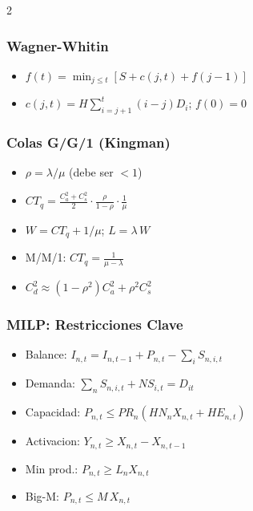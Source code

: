 \documentclass[11pt, a4paper]{article}
\begin{document}
\begin{multicols}{2}
\subsubsection*{Wagner-Whitin}
\begin{itemize}[leftmargin=1.2em, itemsep=1pt, label={$\bullet$}]
  \item $f(t) = \min_{j \le t}[S + c(j,t) + f(j-1)]$
  \item $c(j,t) = H\sum_{i=j+1}^{t}(i-j)D_i$; $f(0)=0$
\end{itemize}

\subsubsection*{Colas G/G/1 (Kingman)}
\begin{itemize}[leftmargin=1.2em, itemsep=1pt, label={$\bullet$}]
  \item $\rho = \lambda/\mu$ (debe ser $<1$)
  \item $CT_q = \frac{C_a^2+C_s^2}{2}\cdot\frac{\rho}{1-\rho}\cdot\frac{1}{\mu}$
  \item $W = CT_q + 1/\mu$; $L = \lambda\,W$
  \item M/M/1: $CT_q = \frac{1}{\mu-\lambda}$
  \item $C_d^2 \approx (1-\rho^2)C_a^2 + \rho^2 C_s^2$
\end{itemize}

\subsubsection*{MILP: Restricciones Clave}
\begin{itemize}[leftmargin=1.2em, itemsep=1pt, label={$\bullet$}]
  \item Balance: $I_{n,t} = I_{n,t-1} + P_{n,t} - \sum_i S_{n,i,t}$
  \item Demanda: $\sum_n S_{n,i,t} + NS_{i,t} = D_{it}$
  \item Capacidad: $P_{n,t} \le PR_n(HN_n X_{n,t} + HE_{n,t})$
  \item Activacion: $Y_{n,t} \ge X_{n,t} - X_{n,t-1}$
  \item Min prod.: $P_{n,t} \ge L_n X_{n,t}$
  \item Big-M: $P_{n,t} \le M\,X_{n,t}$
\end{itemize}


\end{multicols}
\end{document}
